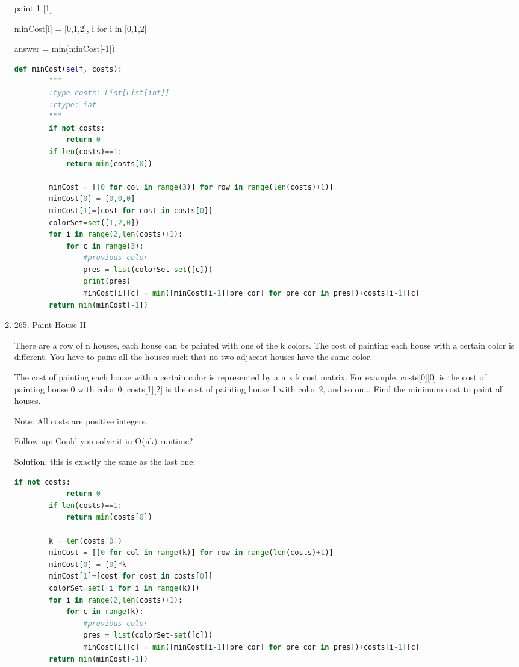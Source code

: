 \documentclass[../main.tex]{subfiles}
\begin{document}
\begin{enumerate}
paint 1 [1]

minCost[i] = [0,1,2], i for i in [0,1,2]

answer = min(minCost[-1])
\begin{lstlisting}[language = Python]
def minCost(self, costs):
        """
        :type costs: List[List[int]]
        :rtype: int
        """
        if not costs:
            return 0
        if len(costs)==1:
            return min(costs[0])
        
        minCost = [[0 for col in range(3)] for row in range(len(costs)+1)]
        minCost[0] = [0,0,0]
        minCost[1]=[cost for cost in costs[0]]
        colorSet=set([1,2,0])
        for i in range(2,len(costs)+1):
            for c in range(3):
                #previous color
                pres = list(colorSet-set([c]))
                print(pres)
                minCost[i][c] = min([minCost[i-1][pre_cor] for pre_cor in pres])+costs[i-1][c]
        return min(minCost[-1])
\end{lstlisting}

\item 265. Paint House II

There are a row of n houses, each house can be painted with one of the k colors. The cost of painting each house with a certain color is different. You have to paint all the houses such that no two adjacent houses have the same color.

The cost of painting each house with a certain color is represented by a n x k cost matrix. For example, costs[0][0] is the cost of painting house 0 with color 0; costs[1][2] is the cost of painting house 1 with color 2, and so on... Find the minimum cost to paint all houses.

Note:
 All costs are positive integers.

Follow up:
 Could you solve it in O(nk) runtime?

Solution: this is exactly the same as the last one:
\begin{lstlisting}[language = Python]
if not costs:
            return 0
        if len(costs)==1:
            return min(costs[0])
        
        k = len(costs[0])
        minCost = [[0 for col in range(k)] for row in range(len(costs)+1)]
        minCost[0] = [0]*k
        minCost[1]=[cost for cost in costs[0]]
        colorSet=set([i for i in range(k)])
        for i in range(2,len(costs)+1):
            for c in range(k):
                #previous color
                pres = list(colorSet-set([c]))
                minCost[i][c] = min([minCost[i-1][pre_cor] for pre_cor in pres])+costs[i-1][c]
        return min(minCost[-1])
\end{lstlisting}


\end{enumerate}
\end{document}
